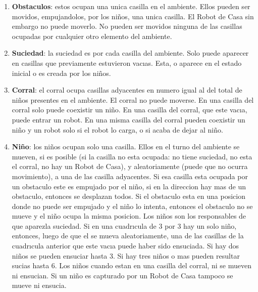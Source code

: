 \documentclass[a4paper,10pt,twocolumn]{article}
\begin{document}
\begin{enumerate}
	\item[] \textbf{Obstaculos}: estos ocupan una unica casilla en el ambiente. Ellos pueden ser movidos, empujandolos, por los ni\~nos, una unica casilla. El Robot de Casa sin embargo no puede moverlo. No pueden ser movidos ninguna de las casillas ocupadas por cualquier otro elemento del ambiente.

	\item[] \textbf{Suciedad}: la suciedad es por cada casilla del ambiente. Solo puede aparecer en casillas que previamente estuvieron vacıas. Esta, o aparece en el estado inicial o es creada por los ni\~nos.

	\item[] \textbf{Corral}: el corral ocupa casillas adyacentes en numero igual al del total de ni\~nos presentes en el ambiente. El corral no puede moverse. En una casilla del corral solo puede coexistir un ni\~no. En una casilla del corral, que este vacıa, puede entrar un robot. En una misma casilla del corral pueden coexistir un ni\~no y un robot solo si el robot lo carga, o si acaba de dejar al ni\~no.

	\item[] \textbf{Ni\~no}: los ni\~nos ocupan solo una casilla. Ellos en el turno del ambiente se mueven, si es posible (si la casilla no esta ocupada: no tiene suciedad, no esta el corral, no hay un Robot de Casa), y aleatoriamente (puede que no ocurra movimiento), a una de las casilla adyacentes. Si esa casilla esta ocupada por un obstaculo este es empujado por el ni\~no, si en la direccion hay mas de un obstaculo, entonces se desplazan todos. Si el obstaculo esta en una posicion donde no puede ser empujado y el ni\~no lo intenta, entonces el obstaculo no se mueve y el ni\~no ocupa la misma posicion. Los ni\~nos son los responsables de que aparezla suciedad. Si en una cuadrıcula de 3 por 3 hay un solo ni\~no, entonces, luego de que el se mueva aleatoriamente, una de las casillas de la cuadrıcula anterior que este vacıa puede haber sido ensuciada. Si hay dos ni\~nos se pueden ensuciar hasta 3. Si hay tres ni\~nos o mas pueden resultar sucias hasta 6. Los ni\~nos cuando estan en una casilla del corral, ni se mueven ni ensucian. Si un ni\~no es capturado por un Robot de Casa tampoco se mueve ni ensucia.


\end{enumerate}
\end{document}
